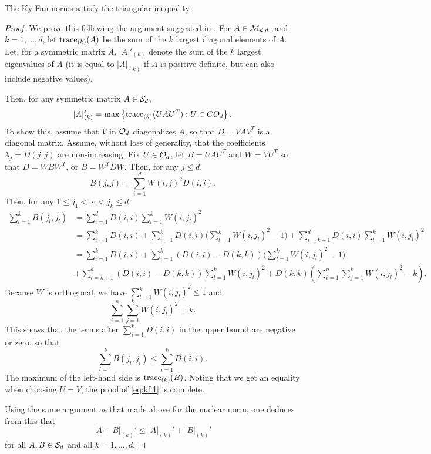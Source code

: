 \begin{proposition}
\label{prop:ky.fan}
The Ky Fan norms satisfy the triangular inequality. 
\end{proposition}
\begin{proof}
We prove this following the argument suggested in \citet{bhatia2013matrix}. For $A\in{\mathcal M}_{d,d}$,  and $k=1, \ldots, d$, let
${\mathrm{trace}}_{(k)}(A)$ be the sum of the $k$   largest diagonal elements of $A$. Let, for a symmetric matrix $A$, $|A|'_{(k)}$ denote the sum of the $k$ largest eigenvalues of $A$ (it is equal to $|A|_{(k)}$ if $A$ is positive definite, but can also include negative values).

Then, for any  symmetric matrix $A\in {\mathcal S}_d$, 
\begin{equation}
\label{eq:kf.1}
|A|'_{(k)} = \max\left\{{\mathrm{trace}}_{(k)}(UAU^T): U\in CO_d\right\}.
\end{equation}
To show this, assume that $V$ in ${\mathcal O}_d$ diagonalizes $A$, so that $D = VAV^T$ is a diagonal matrix. Assume, without loss of generality, that the coefficients $\lambda_j = D(j,j)$ are non-increasing. Fix $U\in {\mathcal O}_d$, let $B = UAU^T$ and $W = VU^T$ so that $D = WBW^T$, or $B = W^TDW$. Then, for any $j\leq d$, 
\[
B(j,j) = \sum_{i=1}^d W(i,j)^2 D(i,i).
\]
Then, for any $1\leq j_1 < \cdots < j_k\leq d$
\begin{align*}
\sum_{l=1}^k B(j_l, j_l) &= \sum_{i=1}^d D(i,i) \sum_{l=1}^k W(i, j_l)^2\\
&= \sum_{i=1}^k D(i,i) + \sum_{i=1}^k D(i,i) \big(\sum_{l=1}^k W(i, j_l)^2 - 1\big) + \sum_{i=k+1}^d D(i,i) \sum_{l=1}^k W(i, j_l)^2\\
&= \sum_{i=1}^k D(i,i) + \sum_{i=1}^k (D(i,i) - D(k,k)) \big(\sum_{l=1}^k W(i, j_l)^2 - 1\big) \\
&+ \sum_{i=k+1}^d (D(i,i) - D(k,k)) \sum_{l=1}^k W(i, j_l)^2
+ D(k,k) \left(\sum_{i=1}^n \sum_{j=1}^k W(i,j_l)^2 - k\right).
\end{align*}
Because $W$ is orthogonal, we have  $\sum_{l=1}^k W(i, j_l)^2 \leq 1$ and 
\[
\sum_{i=1}^n \sum_{j=1}^k W(i,j_l)^2 = k.
\]
This shows that the terms after $\sum_{i=1}^k D(i,i)$ in the upper bound are negative or zero, so that
\[
\sum_{l=1}^k B(j_l, j_l) \leq \sum_{i=1}^k D(i,i).
\]
The maximum of the left-hand side is ${\mathrm{trace}}_{(k)}(B)$. Noting that we get an equality when choosing $U=V$, the proof of \cref{eq:kf.1} is complete.

Using the same argument as that made above for the nuclear norm, one deduces from this that
\[
|A+B|_{(k)}' \leq |A|_{(k)}' + |B|_{(k)}'
\]
for all $A,B \in {\mathcal S}_d$ and all $k=1, \ldots, d$. 


\end{proof}
